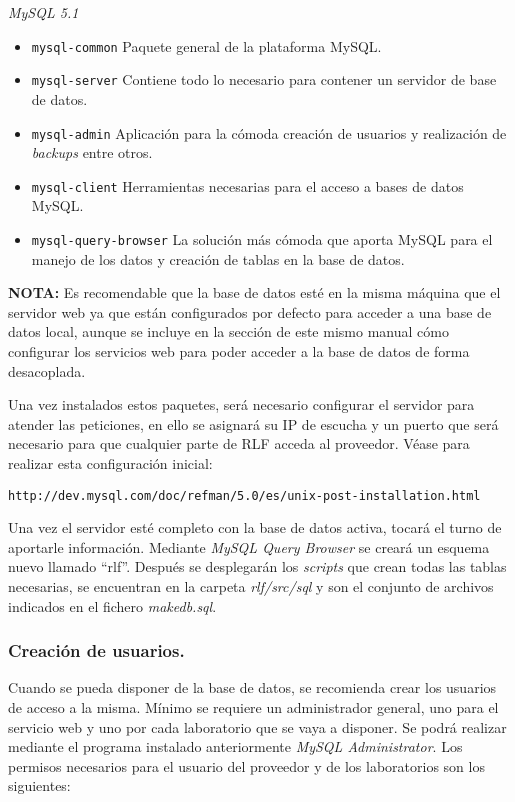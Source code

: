 \textit{MySQL 5.1}

\begin{itemize}
\item \texttt{mysql-common} Paquete general de la plataforma MySQL.
\item \texttt{mysql-server} Contiene todo lo necesario para contener 
un servidor de base de datos.
\item \texttt{mysql-admin} Aplicación para la cómoda creación de 
usuarios y realización de \emph{backups} entre otros.
\item \texttt{mysql-client} Herramientas necesarias para el acceso a 
bases de datos MySQL.
\item \texttt{mysql-query-browser} La solución más cómoda que aporta 
MySQL para el manejo de los datos y creación de tablas en la base de 
datos.
\end{itemize}

\textbf{NOTA:} Es recomendable que la base de datos esté en la misma 
máquina que el servidor web ya que están configurados por defecto 
para acceder a una base de datos local, aunque se incluye en la 
sección de este mismo manual cómo configurar los servicios web para 
poder acceder a la base de datos de forma desacoplada.

Una vez instalados estos paquetes, será necesario configurar el 
servidor para atender las peticiones, en ello se asignará su IP de 
escucha y un puerto que será necesario para que cualquier parte de RLF 
acceda al proveedor. Véase para realizar esta configuración inicial:

\begin{verbatim}
http://dev.mysql.com/doc/refman/5.0/es/unix-post-installation.html
\end{verbatim}

Una vez el servidor esté completo con la base de datos activa, tocará 
el turno de aportarle información. Mediante \emph{MySQL Query Browser} 
se creará un esquema nuevo llamado ``rlf''. Después se desplegarán 
los \emph{scripts} que crean todas las tablas necesarias, se 
encuentran en la carpeta \emph{rlf/src/sql} y son el conjunto de 
archivos indicados en el fichero \emph{makedb.sql}.

\subsubsection*{Creación de usuarios.}
Cuando se pueda disponer de la base de datos, se recomienda crear los 
usuarios de acceso a la misma. Mínimo se requiere un administrador 
general, uno para el servicio web y uno por cada laboratorio que se 
vaya a disponer. Se podrá realizar mediante el programa instalado 
anteriormente \emph{MySQL Administrator}. Los permisos necesarios para 
el usuario del proveedor y de los laboratorios son los siguientes:

